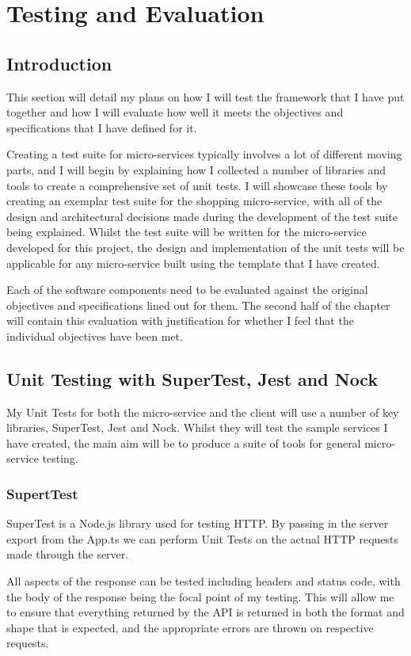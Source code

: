 \chapter{Testing and Evaluation}
\section{Introduction}

This section will detail my plans on how I will test the framework that I have put together and how I will evaluate how well it meets the objectives and specifications that I have defined for it. 

Creating a test suite for micro-services typically involves a lot of different moving parts, and I will begin by explaining how I collected a number of libraries and tools to create a comprehensive set of unit tests. I will showcase these tools by creating an exemplar test suite for the shopping micro-service, with all of the design and architectural decisions made during the development of the test suite being explained. Whilst the test suite will be written for the micro-service developed for this project, the design and implementation of the unit tests will be applicable for any micro-service built using the template that I have created.


Each of the software components need to be evaluated against the original objectives and specifications lined out for them. The second half of the chapter will contain this evaluation with justification for whether I feel that the individual objectives have been met.


\section{Unit Testing with SuperTest, Jest and Nock}

My Unit Tests for both the micro-service and the client will use a number of key libraries, SuperTest, Jest and Nock. Whilst they will test the sample services I have created, the main aim will be to produce a suite of tools for general micro-service testing.
\subsection{SupertTest}
SuperTest is a Node.js library used for testing HTTP. By passing in the server export from the App.ts we can perform Unit Tests on the actual HTTP requests made through the server.

All aspects of the response can be tested including headers and status code, with the body of the response being the focal point of my testing. This will allow me to ensure that everything returned by the API is returned in both the format and shape that is expected, and the appropriate errors are thrown on respective requests.
